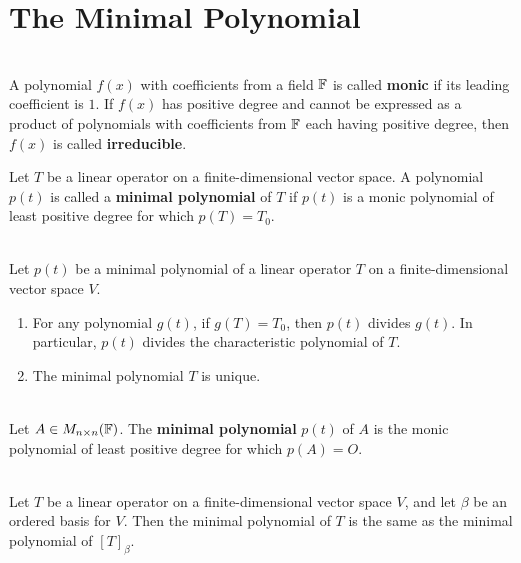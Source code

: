\section{The Minimal Polynomial}

\begin{definition}
	\hfill\\
	A polynomial $f(x)$ with coefficients from a field $\mathbb{F}$ is called \textbf{monic} if its leading coefficient is $1$. If $f(x)$ has positive degree and cannot be expressed as a product of polynomials with coefficients from $\mathbb{F}$ each having positive degree, then $f(x)$ is called \textbf{irreducible}.
\end{definition}

\begin{definition}
	Let $T$ be a linear operator on a finite-dimensional vector space. A polynomial $p(t)$ is called a \textbf{minimal polynomial} of $T$ if $p(t)$ is a monic polynomial of least positive degree for which $p(T) = T_0$.
\end{definition}

\begin{theorem}
	\hfill\\
	Let $p(t)$ be a minimal polynomial of a linear operator $T$ on a finite-dimensional vector space $V$.

	\begin{enumerate}
		\item For any polynomial $g(t)$, if $g(T) = T_0$, then $p(t)$ divides $g(t)$. In particular, $p(t)$ divides the characteristic polynomial of $T$.
		\item The minimal polynomial $T$ is unique.
	\end{enumerate}
\end{theorem}

\begin{definition}
	\hfill\\
	Let $A \in M_{n \times n}(\mathbb{F})$. The \textbf{minimal polynomial} $p(t)$ of $A$ is the monic polynomial of least positive degree for which $p(A) = O$.
\end{definition}

\begin{theorem}
	\hfill\\
	Let $T$ be a linear operator on a finite-dimensional vector space $V$, and let $\beta$ be an ordered basis for $V$. Then the minimal polynomial of $T$ is the same as the minimal polynomial of $[T]_\beta$.
\end{theorem}

